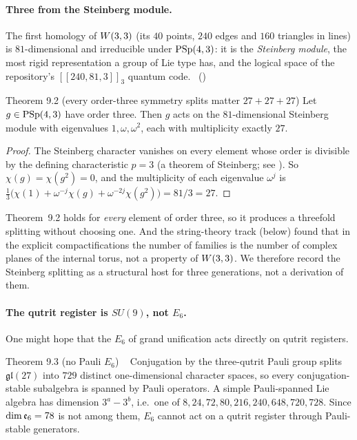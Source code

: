\paragraph{Three from the Steinberg module.}
The first homology of $W(3,3)$ (its $40$ points, $240$ edges and $160$ triangles in lines) is
$81$-dimensional and irreducible under $\mathrm{PSp}(4,3)$: it is the \emph{Steinberg module}, the
most rigid representation a group of Lie type has, and the logical space of the
repository's $[[240,81,3]]_3$ quantum code. \tierC\ ()

\begin{result}{Theorem 9.2 (every order-three symmetry splits matter $27+27+27$) \hfill \tierT}
Let $g\in\mathrm{PSp}(4,3)$ have order three. Then $g$ acts on the $81$-dimensional Steinberg
module with eigenvalues $1,\omega,\omega^2$, each with multiplicity exactly $27$.
\end{result}

\begin{proof}
The Steinberg character vanishes on every element whose order is divisible by the
defining characteristic $p=3$ (a theorem of Steinberg; see \cite{Humphreys}). So $\chi(g)=\chi(g^2)=0$, and the
multiplicity of each eigenvalue $\omega^j$ is
$\tfrac13\bigl(\chi(1)+\omega^{-j}\chi(g)+\omega^{-2j}\chi(g^2)\bigr)=81/3=27$.
\end{proof}

\begin{boundary}
Theorem~9.2 holds for \emph{every} element of order three, so it produces a threefold
splitting without choosing one. And the string-theory track (below) found that in the
explicit compactifications the number of families is the number of complex planes of the
internal torus, not a property of $W(3,3)$. We therefore record the Steinberg splitting as a
structural host for three generations, not a derivation of them. \tierB
\end{boundary}

\paragraph{The qutrit register is $SU(9)$, not $E_6$.}
One might hope that the $E_6$ of grand unification acts directly on qutrit registers.

\begin{result}{Theorem 9.3 (no Pauli $E_6$) \hfill \tierT\ \tierC}
Conjugation by the three-qutrit Pauli group splits $\mathfrak{gl}(27)$ into $729$ distinct
one-dimensional character spaces, so every conjugation-stable subalgebra is spanned by
Pauli operators. A simple Pauli-spanned Lie algebra has dimension $3^a-3^b$, i.e.\ one of
$8,24,72,80,216,240,648,720,728$. Since $\dim\mathfrak{e}_6=78$ is not among them, $E_6$ cannot act
on a qutrit register through Pauli-stable generators.
\end{result}

